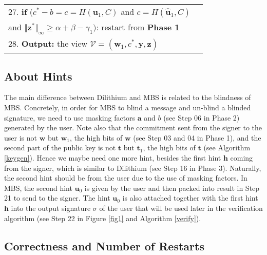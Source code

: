 \documentclass[conference]{IEEEtran}
\begin{document}
\begin{figure*}[pt]
\begin{tabular}{|  l | l | }
			27.		\hspace{0.5cm} \textbf{if} ($c^*-b=c=H(\mathbf{u}_1, C)$ and $c=H(\widehat{\mathbf{u}}_1, C)$ &\\
					\hspace{1.5cm}  and $\Vert\mathbf{z}^* \Vert_{\infty} \geq \alpha+\beta-\gamma_1)$: restart from \textbf{Phase 1} &\\
			
		
			28.		\textbf{Output:} the view $\mathcal{V}=(\mathbf{w}_1,c^*,\mathbf{y}, \mathbf{z})$& \\
			\hline
		\end{tabular}
		
		\medskip
		\caption{The interactive signing protocol \textsf{MBS.Sign}($\mathsf{par}, \textsf{sk},\mu, \textsf{pk}$)} 
		\label{fig1}
	\end{figure*}
	
	
	\subsection{About Hints}  \label{hints}
	  The main difference between \textsf{Dilithium} and \textsf{MBS} is related to the blindness of \textsf{MBS}. Concretely, in order for \textsf{MBS} to blind a message and un-blind a blinded signature, we need to use masking factors $\mathbf{a}$ and $b$ (see Step 06 in Phase 2) generated by the user. Note also that the commitment sent from the signer to the user is not $\mathbf{w}$ but $\mathbf{w}_1$, the high bits of $\mathbf{w}$ (see Step 03 and 04 in Phase 1), and the second part of the public key is not $\textbf{t}$ but $\textbf{t}_1$, the high bits of $\mathbf{t}$ (see Algorithm \ref{keygen}).  Hence we maybe need one more hint, besides the first hint $\mathbf{h}$ coming from the signer, which is similar to \textsf{Dilithium} (see Step 16 in Phase 3). Naturally, the second hint should be from the user due to the use of masking factors. In \textsf{MBS}, the second hint $\mathbf{u}_0$ is given by the user and then packed into \textsf{result} in Step 21 to send to the signer. The hint $\mathbf{u}_0$ is also attached together with the first hint $\mathbf{h}$ into the output signature $\sigma$ of the user that will be used later in the verification algorithm (see Step 22 in Figure \ref{fig1} and Algorithm \ref{verify}). 
	\subsection{Correctness and Number of Restarts}  \label{correct}
\end{document}
